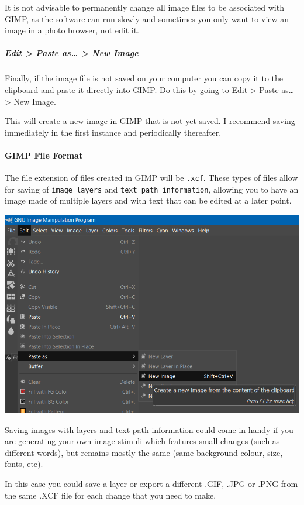 \documentclass[]{book}
\let\oldparagraph\paragraph
\renewcommand{\paragraph}[1]{\oldparagraph{#1}\mbox{}}
\let\oldsubparagraph\subparagraph
\renewcommand{\subparagraph}[1]{\oldsubparagraph{#1}\mbox{}}
\begin{document}
It is not advisable to permanently change all image files to be
associated with GIMP, as the software can run slowly and sometimes you
only want to view an image in a photo browser, not edit it.

\subparagraph{Edit \textgreater{} Paste as\ldots{} \textgreater{} New
Image}\label{edit-paste-as-new-image}

Finally, if the image file is not saved on your computer you can copy it
to the clipboard and paste it directly into GIMP. Do this by going to
Edit \textgreater{} Paste as\ldots{} \textgreater{} New Image.

This will create a new image in GIMP that is not yet saved. I recommend
saving immediately in the first instance and periodically thereafter.

\paragraph{GIMP File Format}\label{gimp-file-format}

The file extension of files created in GIMP will be \texttt{.xcf}. These
types of files allow for saving of \texttt{image\ layers} and
\texttt{text\ path\ information}, allowing you to have an image made of
multiple layers and with text that can be edited at a later point.

\includegraphics{images/screenshots/paste_as_new_gimp.png}

\begin{info}
Saving images with layers and text path information could come in handy
if you are generating your own image stimuli which features small
changes (such as different words), but remains mostly the same (same
background colour, size, fonts, etc).

In this case you could save a layer or export a different .GIF, .JPG or
.PNG from the same .XCF file for each change that you need to make.
\end{info}
\end{document}
